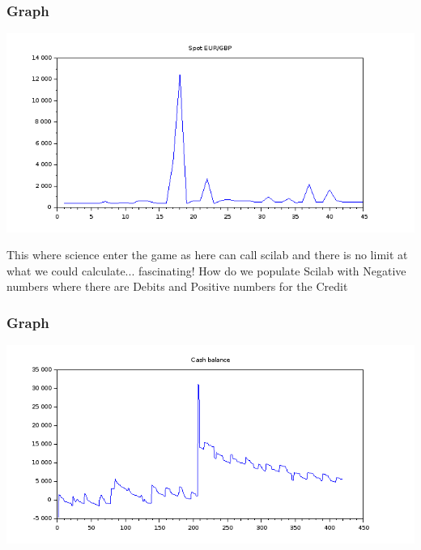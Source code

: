 \documentclass[8pt]{article} %
\begin{document}
%

%

%

%

\subsubsection{Graph}
\includegraphics[scale=0.6]{Vector.png}

This where science enter the game as here can call scilab and there is no limit at what we could calculate... fascinating!
How do we populate Scilab with Negative numbers where there are Debits and Positive numbers for the Credit
\subsubsection{Graph}
\includegraphics[scale=0.6]{Scilab-cashBalance.png}
\end{document}
